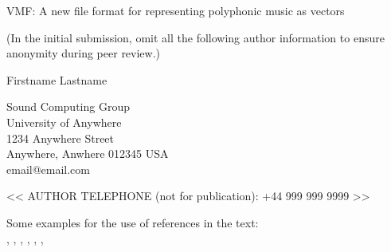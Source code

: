 \documentclass[letterpaper, 12pt]{article}
\begin{document}
{\cmjTitle VMF: A new file format for representing polyphonic music as vectors}
\vspace*{24pt}

(In the initial submission, omit all the following author information to ensure anonymity during peer review.)

{\cmjAuthor Firstname Lastname}
\newline
\begin{cmjAuthorAddress}
	Sound Computing Group\\
	University of Anywhere\\
	1234 Anywhere Street\\
	Anywhere, Anwhere 012345 USA\\
	email@email.com
\end{cmjAuthorAddress}

\vspace*{24pt}
{\cmjAuthorPhone << AUTHOR TELEPHONE (not for publication): +44 999 999 9999 >>}
\vspace*{24pt}



\parskip 18pt

\vspace*{24pt}

Some examples for the use of references in the text:\\
\cite{Ano08}, \cite{Bele68}, \cite{Ther99}, \cite{Zica02},
\cite*{VeRo00}, \cite*{AtDa04}, 
\citep*{AtDa04} 



\end{document}
